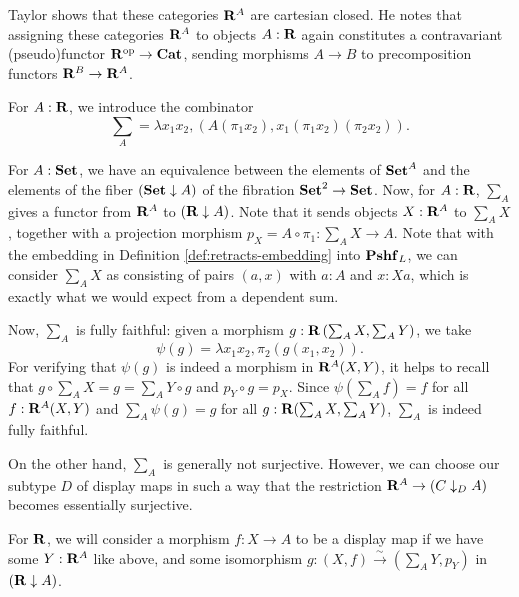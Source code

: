 Taylor shows that these categories $ \mathbf{R}^A $ are cartesian closed. He notes that assigning these categories $ \mathbf{R}^A $ to objects $ A: \mathbf{R} $ again constitutes a contravariant (pseudo)functor $ \mathbf{R}^{\text{op}} \to \mathbf{Cat} $, sending morphisms $ A \to B $ to precomposition functors $ \mathbf{R}^B \to \mathbf{R}^A $.

For $ A: \mathbf{R} $, we introduce the combinator
\[ \sum_A = \lambda x_1 x_2, (A (\pi_1 x_2), x_1 (\pi_1 x_2) (\pi_2 x_2)). \]

For $ A: \mathbf{Set} $, we have an equivalence between the elements of $ \mathbf{Set}^A $ and the elements of the fiber $ (\mathbf{Set} \downarrow A) $ of the fibration $ \mathbf{Set}^2 \to \mathbf{Set} $. Now, for $ A: \mathbf{R} $, $ \sum_A $ gives a functor from $ \mathbf{R}^A $ to $ (\mathbf{R} \downarrow A) $. Note that it sends objects $ X: \mathbf{R}^A $ to $ \sum_A X $, together with a projection morphism $ p_X = A \circ \pi_1: \sum_A X \to A $. Note that with the embedding in Definition \ref{def:retracts-embedding} into $ \mathbf{Pshf}_{L} $, we can consider $ \sum_A X $ as consisting of pairs $ (a, x) $ with $ a : A $ and $ x : X a $, which is exactly what we would expect from a dependent sum.

Now, $ \sum_A $ is fully faithful: given a morphism $ g: \mathbf{R}\left(\sum_A X, \sum_A Y\right) $, we take
\[ \psi(g) = \lambda x_1 x_2, \pi_2 (g (x_1, x_2)). \]
For verifying that $ \psi(g) $ is indeed a morphism in $ \mathbf{R}^A(X, Y) $, it helps to recall that $ g \circ \sum_A X = g = \sum_A Y \circ g $ and $ p_Y \circ g = p_X $. Since $ \psi(\sum_A f) = f $ for all $ f: \mathbf{R}^A(X, Y) $ and $ \sum_A \psi(g) = g $ for all $ g: \mathbf{R}(\sum_A X, \sum_A Y) $, $ \sum_A $ is indeed fully faithful.

On the other hand, $ \sum_A $ is generally not surjective. However, we can choose our subtype $ D $ of display maps in such a way that the restriction $ \mathbf{R}^A \to (C \downarrow_D A) $ becomes essentially surjective.

\begin{definition}
  For $ \mathbf{R} $, we will consider a morphism $ f: X \to A $ to be a display map if we have some $ Y : \mathbf{R}^A $ like above, and some isomorphism $ g: (X, f) \xrightarrow{\sim} (\sum_A Y, p_Y) $ in $ (\mathbf{R} \downarrow A) $.
\end{definition}

